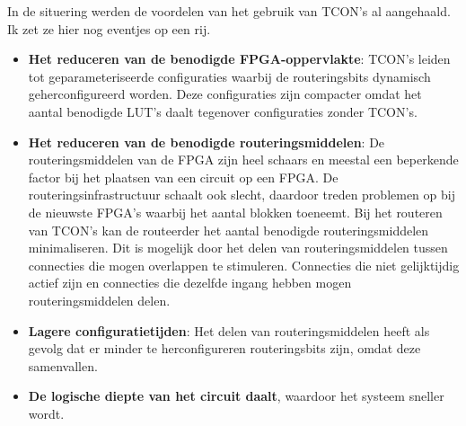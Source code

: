 \documentclass[a4paper,oneside,12pt]{article}
\begin{document}
In de situering werden de voordelen van het gebruik van TCON's al aangehaald. Ik zet ze hier nog eventjes op een rij.
\begin{itemize}
\item \textbf{Het reduceren van de benodigde FPGA-oppervlakte}: TCON's leiden tot geparameteriseerde configuraties waarbij de routeringsbits dynamisch geherconfigureerd worden. Deze configuraties zijn compacter omdat het aantal benodigde LUT's daalt tegenover configuraties zonder TCON's. 
\item \textbf{Het reduceren van de benodigde routeringsmiddelen}: De routeringsmiddelen van de FPGA zijn heel schaars en meestal een beperkende factor bij het plaatsen van een circuit op een FPGA. De routeringsinfrastructuur schaalt ook slecht, daardoor treden problemen op bij de nieuwste FPGA's waarbij het aantal blokken toeneemt. Bij het routeren van TCON's kan de routeerder het aantal benodigde routeringsmiddelen minimaliseren. Dit is mogelijk door het delen van routeringsmiddelen tussen connecties die mogen overlappen te stimuleren. Connecties die niet gelijktijdig actief zijn en connecties die dezelfde ingang hebben mogen routeringsmiddelen delen.
\item \textbf{Lagere configuratietijden}: Het delen van routeringsmiddelen heeft als gevolg dat er minder te herconfigureren routeringsbits zijn, omdat deze samenvallen.
\item \textbf{De logische diepte van het circuit daalt}, waardoor het systeem sneller wordt.
\end{itemize}
\end{document}
